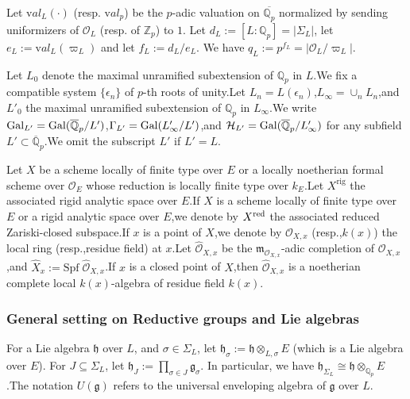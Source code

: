 \documentclass[SecEq,CM,GP]{degruyter-crelle} %
\theoremstyle{plain}
\newcommand{\gal}{{\rm Gal}}
\newcommand{\red}{{\rm red}}
\newcommand{\valua}{\mathrm val}
\newcommand{\BQ}{{\mathbb{Q}}}
\newcommand{\BZ}{{\mathbb{Z}}}
\newcommand{\co}{\mathcal O}
\newcommand{\cH}{\mathcal H}
\newcommand{\cO}{\mathcal O}
\newcommand{\fg}{{\mathfrak{g}}}
\newcommand{\fh}{{\mathfrak{h}}}
\newcommand{\fm}{{\mathfrak{m}}}
\begin{document}
Let $\valua_L(\cdot)$ (resp. $\valua_p$) be the $p$-adic valuation on $\overline{\BQ_p}$ normalized by sending uniformizers of $\co_L$ (resp. of $\BZ_p$) to $1$. Let $d_L:=[L:\BQ_p]=|\Sigma_L|$, let $e_L:=\valua_L(\varpi_L)$ and let $f_L:=d_L/e_L$. We have $q_L:=p^{f_L}=|\co_L/\varpi_L|$.

Let $L_0$ denote the maximal unramified subextension of $\BQ_p$ in $L$.\;We fix a compatible system $\{\epsilon_n\}$ of $p$-th roots of unity.\;Let $L_n=L(\epsilon_n)$,\;$L_\infty=\cup_nL_n$,\;and $L'_0$ the maximal unramified subextension of $\BQ_p$ in $L_\infty$.\;We write $\gal_{L'}=\gal(\overline{\BQ}_p/L')$,\;$\Gamma_{L'}=\gal(L'_{\infty}/L')$,\;and $\cH_{L'}=\gal(\overline{\BQ}_p/L'_{\infty})$ for any subfield $L'\subset \overline{\BQ}_p$.\;We omit the subscript ${L'}$ if $L'=L$.\;

Let $X$ be a scheme locally of finite type over $E$ or a locally noetherian formal scheme over $\cO_E$ whose reduction is locally finite type over $k_E$.\;Let $X^{\mathrm{rig}}$ the associated rigid analytic space over $E$.\;If $X$ is a scheme locally of finite type over $E$ or a rigid analytic space over $E$,\;we denote by $X^{\red}$ the associated reduced Zariski-closed subspace.\;If $x$ is a point of $X$,\;we denote by $\cO_{X,x}$ (resp.,\;$k(x)$) the  local ring (resp.,\;residue field) at $x$.\;Let $\widehat{\cO}_{X,x}$ be the $\fm_{\cO_{X,x}}$-adic completion of $\cO_{X,x}$,\;and $\widehat{X}_{x}:=\mathrm{Spf}\;\widehat{\cO}_{X,x}$.\;If $x$ is a closed point of $X$,\;then  $\widehat{\cO}_{X,x}$ is a noetherian complete local $k(x)$-algebra of residue field $k(x)$.\;

\subsubsection*{General setting on Reductive groups and Lie algebras}
For a Lie algebra $\fh$ over $L$, and $\sigma\in \Sigma_L$, let $\fh_{\sigma}:=\fh\otimes_{L,\sigma} E$ (which is  a Lie algebra over $E$). For $J\subseteq \Sigma_L$, let $\fh_J:=\prod_{\sigma\in J} \fg_{\sigma}$. In particular, we have $\fh_{\Sigma_L}\cong \fh\otimes_{\BQ_p} E$.\;The notation $U(\fg)$ refers to the universal enveloping algebra of $\fg$ over $L$.\;
\end{document}
